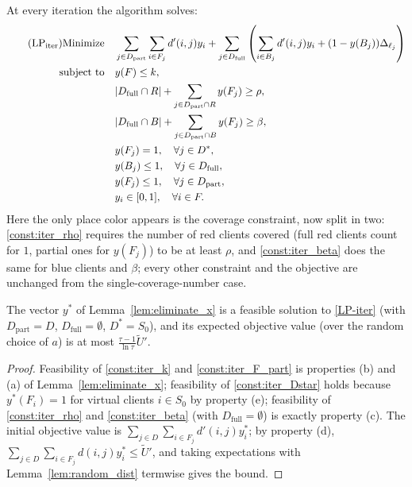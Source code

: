 \documentclass[a4paper,11pt]{article}
\begin{document}
At every iteration the algorithm solves:
\begin{align} \tag{$\text{LP}_{\text{iter}}$} \label{LP-iter}
\text{Minimize} \quad & \sum_{j \in D_\text{part}} \sum_{i \in F_j} d'(i,j) y_i + \sum_{j \in D_\text{full}} \left( \sum_{i \in B_j} d'(i,j) y_i + (1 - y(B_j)) \Delta_{\ell_j} \right) \\
\text{subject to} \quad & y(F) \leq k, \label{const:iter_k} \\
& |D_\text{full} \cap R| + \sum_{j \in D_\text{part} \cap R} y(F_j) \geq \rho, \label{const:iter_rho} \\
& |D_\text{full} \cap B| + \sum_{j \in D_\text{part} \cap B} y(F_j) \geq \beta, \label{const:iter_beta} \\
& y(F_j) = 1, \quad \forall j \in D^*, \label{const:iter_Dstar} \\
& y(B_j) \leq 1, \quad \forall j \in D_\text{full}, \label{const:iter_B_full} \\
& y(F_j) \leq 1, \quad \forall j \in D_\text{part}, \label{const:iter_F_part} \\
& y_i \in [0,1], \quad \forall i \in F. \label{const:iter_domain}
\end{align}
Here the only place color appears is the coverage constraint, now split
in two: \eqref{const:iter_rho} requires the number of red clients
covered (full red clients count for $1$, partial ones for $y(F_j)$) to
be at least $\rho$, and \eqref{const:iter_beta} does the same for blue
clients and $\beta$; every other constraint and the objective are
unchanged from the single-coverage-number case.

\begin{lemma}
\label{lem:iter_lp_feasible}
The vector $y^*$ of Lemma~\ref{lem:eliminate_x} is a feasible solution to
\eqref{LP-iter} (with $D_\text{part}=D$, $D_\text{full}=\emptyset$,
$D^*=S_0$), and its expected objective value (over the random choice of
$a$) is at most $\frac{\tau-1}{\ln\tau}\tilde U'$.
\end{lemma}

\begin{proof}
Feasibility of \eqref{const:iter_k} and \eqref{const:iter_F_part} is
properties (b) and (a) of Lemma~\ref{lem:eliminate_x}; feasibility of
\eqref{const:iter_Dstar} holds because $y^*(F_i)=1$ for virtual clients
$i\in S_0$ by property (e); feasibility of \eqref{const:iter_rho} and
\eqref{const:iter_beta} (with $D_\text{full}=\emptyset$) is exactly
property (c). The initial objective value is $\sum_{j\in D}\sum_{i\in
F_j} d'(i,j)y_i^*$; by property (d), $\sum_{j\in D}\sum_{i\in F_j}
d(i,j)y_i^*\le\tilde U'$, and taking expectations with
Lemma~\ref{lem:random_dist} termwise gives the bound.
\end{proof}
\end{document}
